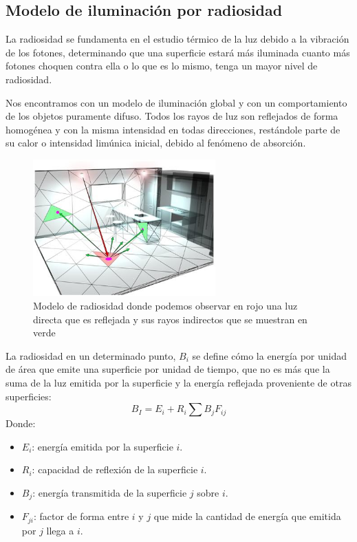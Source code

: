 \subsection{Modelo de iluminación por radiosidad}

La radiosidad se fundamenta en el estudio térmico de la luz debido a la vibración de los fotones, determinando que una superficie estará más iluminada cuanto más fotones choquen contra ella o lo que es lo mismo, tenga un mayor nivel de radiosidad. 
\newline 

Nos encontramos con un modelo de iluminación global y con un comportamiento de los objetos puramente difuso. Todos los rayos de luz son reflejados de forma homogénea y con la misma intensidad en todas direcciones, restándole parte de su calor o intensidad limúnica inicial, debido al fenómeno de absorción.
\newline 

\begin{figure}[h!]
	\centering
	          \includegraphics[width=7cm]{img/radiositymodel.jpg}
	\caption{Modelo de radiosidad donde podemos observar en rojo una luz directa que es reflejada y sus rayos indirectos que se muestran en verde}
\end{figure}

La radiosidad en un determinado punto, $ B_i $ se define cómo la energía por unidad de área que emite una superficie por unidad de tiempo, que no es más que la suma de la luz emitida por la superficie y la energía reflejada proveniente de otras superficies:
	$$ B_I = E_i + R_i \sum B_jF_{ij} $$ 
Donde:
\begin{itemize}
\item $E_i$: energía emitida por la superficie $i$.
\item $R_i$: capacidad de reflexión de la superficie $i$.
\item $B_j$: energía transmitida de la superficie $j$ sobre $i$.
\item $F_{ji}$: factor de forma entre $i$ y $j$ que mide la cantidad de energía que emitida por $j$ llega a $i$.
\end{itemize}

